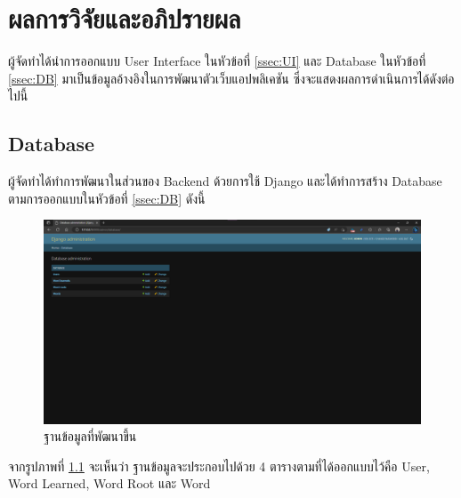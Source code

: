\documentclass[12pt,oneside,openright,a4paper]{cpe-thai-project}
\begin{document}
\chapter{ผลการวิจัยและอภิปรายผล}

\hspace{1cm}
ผู้จัดทำได้นำการออกแบบ User Interface ในหัวข้อที่ \ref{ssec:UI} และ Database ในหัวข้อที่ \ref{ssec:DB}
มาเป็นข้อมูลอ้างอิงในการพัฒนาตัวเว็บแอปพลิเคชัน ซึ่งจะแสดงผลการดำเนินการได้ดังต่อไปนี้

\section{Database}
\hspace{1cm}
ผู้จัดทำได้ทำการพัฒนาในส่วนของ Backend ด้วยการใช้ Django และได้ทำการสร้าง Database ตามการออกแบบในหัวข้อที่ \ref{ssec:DB}
ดังนี้

\begin{figure}[!h]\centering
	\includegraphics[width=\textwidth, keepaspectratio=true]{image/chap4/DB/db.png}
	\caption{{ฐานข้อมูลที่พัฒนาขึ้น}}\label{fig:chap4DB}
\end{figure}
\hspace{1cm}
จากรูปภาพที่ \ref{fig:chap4DB} จะเห็นว่า ฐานข้อมูลจะประกอบไปด้วย 4 ตารางตามที่ได้ออกแบบไว้คือ User, Word Learned,
Word Root และ Word 
\end{document}
